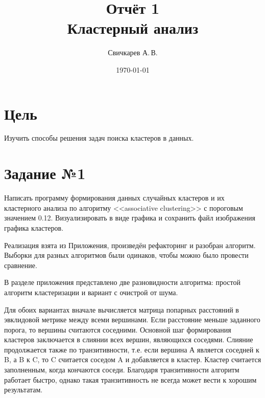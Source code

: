 \documentclass{article} %
\title{Отчёт 1\protect\\Кластерный анализ} %
\author{Свичкарев А.\,В.} %
\date{\today} %
\begin{document}

\maketitle %

\section{Цель}
Изучить способы решения задач поиска кластеров в данных.

\section{Задание №1}
Написать программу формирования данных случайных кластеров и
их кластерного анализа по алгоритму <<associative clustering>> с пороговым значением 0.12.
Визуализировать в виде графика и сохранить файл изображения графика кластеров.

\clearpage

Реализация взята из Приложения, произведён рефакторинг и разобран алгоритм.
Выборки для разных алгоритмов были одинаков, чтобы можно было провести сравнение.

\noindent{}

В разделе приложения представлено две разновидности алгоритма:
простой алгоритм кластеризации и вариант с очистрой от шума.

Для обоих вариантах вначале вычисляется матрица попарных расстояний в эвклидовой метрике между всеми вершинами.
Если расстояние меньше заданного порога, то вершины считаются соседними.
Основной шаг формирования кластеров заключается в слиянии всех вершин, являющихся соседями.
Слияние продолжается также по транзитивности,
т.е. если вершина А является соседней к B,
а B к C, то C считается соседом A и добавляется в кластер.
Кластер считается заполненным, когда кончаются соседи.
Благодаря транзитивности алгоритм работает быстро,
однако такая транзитивность не всегда может вести к хорошим результатам.
\end{document}
